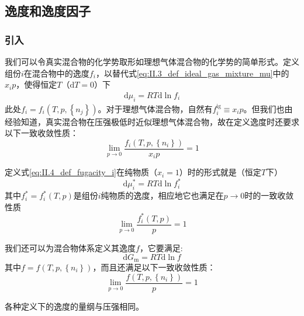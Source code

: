 \documentclass[main.tex]{subfiles}
\begin{document}
\subsection{逸度和逸度因子}
\subsubsection{引入}
我们可以令真实混合物的化学势取形如理想气体混合物的化学势的简单形式。定义组份$i$在混合物中的逸度$f_i$，以替代式\eqref{eq:II.3_def_ideal_gas_mixture_mu}中的$x_ip$，使得恒定$T$（$\mathrm{d}T=0$）下
\begin{align}\label{eq:II.4_def_fugacity_i}
    \mathrm{d}\mu_i=RT\mathrm{d}\ln f_i
\end{align}
此处$f_i=f_i\left(T,p,\left\{n_j\right\}\right)$。对于理想气体混合物，自然有$f_i^\text{ig}\equiv x_i p$。但我们也由经验知道，真实混合物在压强极低时近似理想气体混合物，故在定义逸度时还要求以下一致收敛性质：
\[\lim_{p\to 0}\frac{f_i\left(T,p,\left\{n_i\right\}\right)}{x_i p}=1\]

定义式\eqref{eq:II.4_def_fugacity_i}在纯物质（$x_i=1$）时的形式就是（恒定$T$下）
\begin{equation}\label{eq:II.4_def_fugacity_i*}
    \mathrm{d}\mu_i^*=RT\mathrm{d}\ln f_i^*
\end{equation}
其中$f_i^*=f_i^*\left(T,p\right)$是组份$i$纯物质的逸度，相应地它也满足在$p\rightarrow 0$时的一致收敛性质
\[\lim_{p\to 0}\frac{f_i^*\left(T,p\right)}{p}=1\]

我们还可以为混合物体系定义其逸度$f$，它要满足:
\begin{equation}\label{II.4_def_fugacity_f}
    \mathrm{d}G_\text{m}=RT\mathrm{d}\ln f
\end{equation}
其中$f=f\left(T,p,\left\{n_i\right\}\right)$，而且还满足以下一致收敛性质：
\[\lim_{p\to 0}\frac{f\left(T,p,\left\{n_i\right\}\right)}{p}=1\]

各种定义下的逸度的量纲与压强相同。
\end{document}
